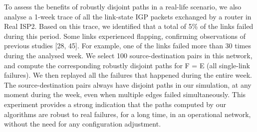 To assess the benefits of robustly disjoint paths in a real-life scenario, 
we also analyse a 1-week trace of all the link-state IGP packets
exchanged by a router in Real ISP2. Based on this trace, we identified 
that a total of 5\% of the links failed during this period. Some
links experienced flapping, confirming observations of previous
studies [28, 45]. For example, one of the links failed more than 30
times during the analysed week. We select 100 source-destination
pairs in this network, and compute the corresponding robustly
disjoint paths for F = E (all single-link failures). We then replayed
all the failures that happened during the entire week. The 
source-destination pairs always have disjoint paths in our simulation, at
any moment during the week, even when multiple edges failed
simultaneously. This experiment provides a strong indication that
the paths computed by our algorithms are robust to real failures,
for a long time, in an operational network, without the need for
any configuration adjustment.
